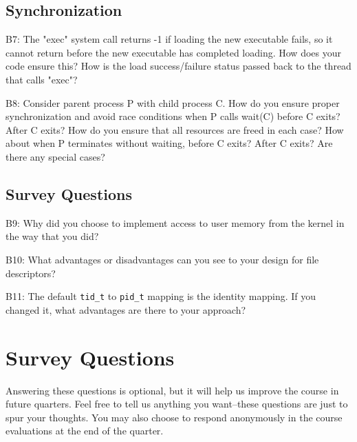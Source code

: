\documentclass[journal]{IEEEtran}
\begin{document}
\subsection{Synchronization}
B7: The "exec" system call returns -1 if loading the new executable fails, so it cannot return before the new executable has completed loading.  How does your code ensure this?  How is the load success/failure status passed back to the thread that calls "exec"?

B8: Consider parent process P with child process C.  How do you ensure proper synchronization and avoid race conditions when P calls wait(C) before C exits?  After C exits?  How do you ensure that all resources are freed in each case?  How about when P terminates without waiting, before C exits?  After C exits?  Are there any special cases?

\subsection{Survey Questions}
B9: Why did you choose to implement access to user memory from the kernel in the way that you did?

B10: What advantages or disadvantages can you see to your design for file descriptors?

B11: The default \lstinline{tid_t} to \lstinline{pid_t} mapping is the identity mapping. If you changed it, what advantages are there to your approach?


\section{Survey Questions}
Answering these questions is optional, but it will help us improve the
course in future quarters.  Feel free to tell us anything you
want--these questions are just to spur your thoughts.  You may also
choose to respond anonymously in the course evaluations at the end of
the quarter.
\end{document}
